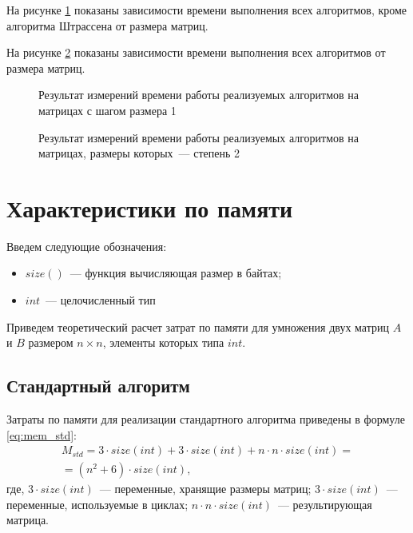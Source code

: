 %     

На рисунке \ref{fig:nonstrassen} показаны зависимости времени выполнения всех алгоритмов, кроме алгоритма Штрассена от размера матриц.

На рисунке \ref{fig:strassen} показаны зависимости времени выполнения всех алгоритмов от размера матриц.


\begin{figure}[H]
    \centering
    
    \caption{Результат измерений времени работы реализуемых алгоритмов на матрицах с шагом размера 1}
    \label{fig:nonstrassen}
\end{figure}


\begin{figure}[H]
    \centering
    
    \caption{Результат измерений времени работы реализуемых алгоритмов на матрицах, размеры которых~--- степень 2}
    \label{fig:strassen}
\end{figure}

\section{Характеристики по памяти}
Введем следующие обозначения:
\begin{itemize}
	\item $size()$~--- функция вычисляющая размер в байтах;
	\item $int$~--- целочисленный тип
\end{itemize}

Приведем теоретический расчет затрат по памяти для умножения двух матриц $A$ и $B$ размером $n \times n$, элементы которых типа $int$.

\subsection*{Стандартный алгоритм}
Затраты по памяти для реализации стандартного алгоритма приведены в формуле \ref{eq:mem_std}:
\begin{equation}
	\label{eq:mem_std}
	\begin{gathered}
		M_{std} = 3 \cdot size(int) + 3 \cdot size(int) + n \cdot n \cdot size(int) = \\ = (n^{2} + 6) \cdot size(int),
	\end{gathered}
\end{equation}
где, $3 \cdot size(int)$~--- переменные, хранящие размеры матриц;
\newline $3 \cdot size(int)$~--- переменные, используемые в циклах;
\newline $n \cdot n \cdot size(int)$~--- результирующая матрица.

